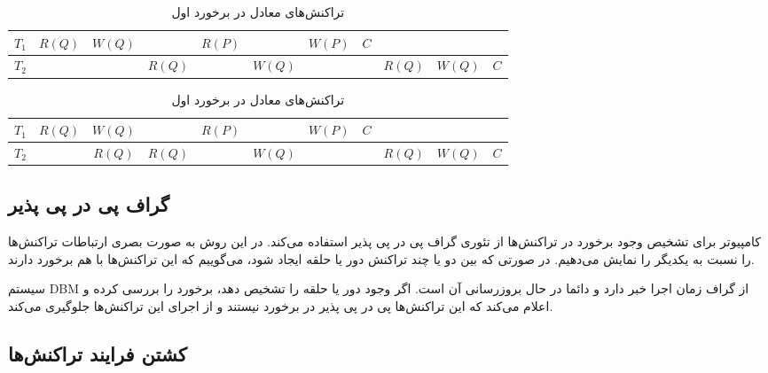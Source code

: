 \documentclass[a4paper]{article}
\begin{document}
\begin{LTR}
    \begin{table}[h]
        \centering
        \begin{RTL}
            \caption{تراکنش‌های معادل در برخورد اول}
        \end{RTL}
        \begin{tabular}{|c|c|c|c|c|c|c|c|c|c|c|}
            \hline
            $T_{1}$ & $R(Q)$ & $W(Q)$ & & $R(P)$ & & $W(P)$ & $C$ & & & \\ \hline
            $T_{2}$ & & & $R(Q)$ & & $W(Q)$ & &  & $R(Q)$ & $W(Q)$ & $C$ \\ \hline
        \end{tabular}
    \end{table}
\end{LTR}


\begin{LTR}
    \begin{table}[h]
        \centering
        \begin{RTL}
            \caption{تراکنش‌های معادل در برخورد اول}
        \end{RTL}
        \begin{tabular}{|c|c|c|c|c|c|c|c|c|c|c|}
            \hline
            $T_{1}$ & $R(Q)$ & $W(Q)$ & & $R(P)$ & & $W(P)$ & $C$ & & & \\ \hline
            $T_{2}$ & & $R(Q)$ & $R(Q)$ & & $W(Q)$ & &  & $R(Q)$ & $W(Q)$ & $C$ \\ \hline
        \end{tabular}
    \end{table}
\end{LTR}

\subsection{گراف پی در پی پذیر}

کامپیوتر برای تشخیص وجود برخورد در تراکنش‌ها از تئوری گراف پی در پی پذیر استفاده
می‌کند. در این روش به صورت بصری ارتباطات تراکنش‌ها را ‌نسبت به یکدیگر را نمایش
می‌دهیم. در صورتی که بین دو یا چند تراکنش دور یا حلقه ایجاد شود، می‌گوییم که این
تراکنش‌ها با هم برخورد دارند.

سیستم DBM از گراف زمان اجرا خبر دارد و دائما در حال بروزرسانی آن است. اگر وجود
دور یا حلقه را تشخیص دهد، برخورد را بررسی کرده و اعلام می‌کند که این تراکنش‌ها
پی در پی پذیر در برخورد نیستند و از اجرای این تراکنش‌ها جلوگیری می‌کند.

\subsection{کشتن فرایند تراکنش‌ها}
\end{document}
